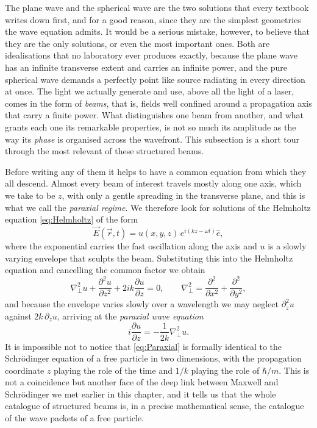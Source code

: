        The plane wave and the spherical wave are the two solutions that every textbook writes down first, and for a good reason, since they are the simplest geometries the wave equation admits. It would be a serious mistake, however, to believe that they are the only solutions, or even the most important ones. Both are idealisations that no laboratory ever produces exactly, because the plane wave has an infinite transverse extent and carries an infinite power, and the pure spherical wave demands a perfectly point like source radiating in every direction at once. The light we actually generate and use, above all the light of a laser, comes in the form of \textit{beams}, that is, fields well confined around a propagation axis that carry a finite power. What distinguishes one beam from another, and what grants each one its remarkable properties, is not so much its amplitude as the way its \textit{phase} is organised across the wavefront. This subsection is a short tour through the most relevant of these structured beams.

       Before writing any of them it helps to have a common equation from which they all descend. Almost every beam of interest travels mostly along one axis, which we take to be $z$, with only a gentle spreading in the transverse plane, and this is what we call the \textit{paraxial regime}. We therefore look for solutions of the Helmholtz equation \ref{eq:Helmholtz} of the form
       \begin{equation*}
            \vec{E}(\vec{r},t) = u(x,y,z)\,e^{i(kz-\omega t)}\hat{e},
       \end{equation*}
       where the exponential carries the fast oscillation along the axis and $u$ is a slowly varying envelope that sculpts the beam. Substituting this into the Helmholtz equation and cancelling the common factor we obtain
       \begin{equation*}
            \nabla_\perp^2 u + \frac{\partial^2 u}{\partial z^2} + 2ik\frac{\partial u}{\partial z} = 0, \qquad \nabla_\perp^2 = \frac{\partial^2}{\partial x^2} + \frac{\partial^2}{\partial y^2},
       \end{equation*}
       and because the envelope varies slowly over a wavelength we may neglect $\partial_z^2 u$ against $2k\,\partial_z u$, arriving at the \textit{paraxial wave equation}
       \begin{equation}\label{eq:Paraxial}
            i\frac{\partial u}{\partial z} = -\frac{1}{2k}\nabla_\perp^2 u.
       \end{equation}
       It is impossible not to notice that \ref{eq:Paraxial} is formally identical to the Schrödinger equation of a free particle in two dimensions, with the propagation coordinate $z$ playing the role of the time and $1/k$ playing the role of $\hbar/m$. This is not a coincidence but another face of the deep link between Maxwell and Schrödinger we met earlier in this chapter, and it tells us that the whole catalogue of structured beams is, in a precise mathematical sense, the catalogue of the wave packets of a free particle.

